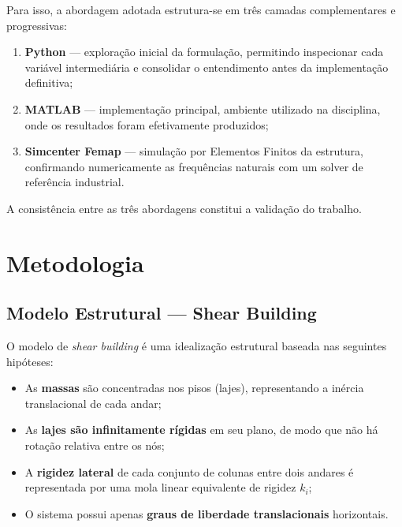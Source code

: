 \documentclass[12pt, a4paper, oneside]{article}
\numberwithin{equation}{section}
\numberwithin{figure}{section}
\numberwithin{table}{section}
\begin{document}
Para isso, a abordagem adotada estrutura-se em três camadas complementares e
progressivas:

\begin{enumerate}
    \item \textbf{Python} --- exploração inicial da formulação, permitindo
      inspecionar cada variável intermediária e consolidar o entendimento
      antes da implementação definitiva;
      
    \item \textbf{MATLAB} --- implementação principal, ambiente utilizado
      na disciplina, onde os resultados foram efetivamente produzidos;
      
    \item \textbf{Simcenter Femap} --- simulação por Elementos Finitos
        da estrutura, confirmando numericamente as frequências naturais com um
        solver de referência industrial.
\end{enumerate}

A consistência entre as três abordagens constitui a validação do trabalho.

\section{Metodologia}

\subsection{Modelo Estrutural --- Shear Building}

O modelo de \textit{shear building} é uma idealização estrutural baseada nas
seguintes hipóteses:

\begin{itemize}
  \item As \textbf{massas} são concentradas nos pisos (lajes), representando a
        inércia translacional de cada andar;
  \item As \textbf{lajes são infinitamente rígidas} em seu plano, de modo que
        não há rotação relativa entre os nós;
  \item A \textbf{rigidez lateral} de cada conjunto de colunas entre dois
        andares é representada por uma mola linear equivalente de rigidez
        $k_i$;
  \item O sistema possui apenas \textbf{graus de liberdade translacionais}
        horizontais.
\end{itemize}
\end{document}
